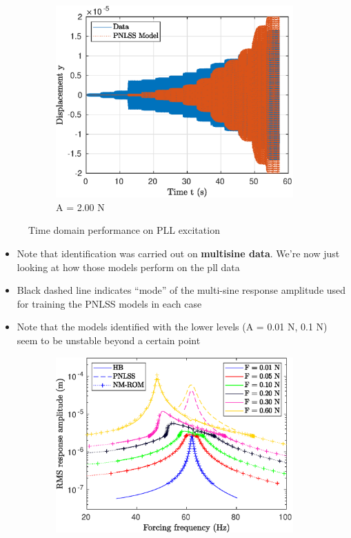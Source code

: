 \documentclass[aspectratio=169]{beamer}
\begin{document}
\begin{frame}[allowframebreaks]
\begin{figure}[!h]
    \begin{subfigure}[!h]{0.2\linewidth}
      \includegraphics[width=\linewidth]{../../benchmark4/FIGURES/PNLSS_PLL_TRESP_famp20_nx23}
      \caption{A = 2.00 N}
    \end{subfigure}
    \caption{Time domain performance on PLL excitation}
    \label{fig:sd}
  \end{figure}
  \vspace{-1cm}
  \begin{itemize}
  \item Note that identification was carried out on \textbf{multisine
      data}. We're now just looking at how those models perform on the
    pll data
  \item Black dashed line indicates ``mode'' of the multi-sine
    response amplitude used for training the PNLSS models in each case 
  \item Note that the models identified with the lower levels (A =
    0.01 N, 0.1 N) seem to be unstable beyond a certain point
  \end{itemize}
  \begin{figure}[!h]
    \centering
    \begin{subfigure}[!h]{0.2\linewidth}
      \includegraphics[width=\linewidth]{../../benchmark4/extabs_fig/b4_fresp_comp_famp001_nx23}

\end{subfigure}
\end{figure}
\end{frame}
\end{document}
